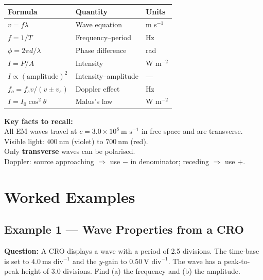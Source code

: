 \begin{minipage}{\linewidth}
\begin{tcolorbox}[colback=lightgold, colframe=accentgold]
\renewcommand{\arraystretch}{1.8}
\begin{tabular}{@{}lll@{}}
\toprule
\textbf{Formula} & \textbf{Quantity} & \textbf{Units} \\
\midrule
$v = f\lambda$ & Wave equation & m s$^{-1}$ \\
$f = 1/T$ & Frequency--period & Hz \\
$\phi = 2\pi d/\lambda$ & Phase difference & rad \\
$I = P/A$ & Intensity & W m$^{-2}$ \\
$I \propto (\text{amplitude})^2$ & Intensity--amplitude & --- \\
$f_o = f_s v/(v \pm v_s)$ & Doppler effect & Hz \\
$I = I_0 \cos^2\theta$ & Malus's law & W m$^{-2}$ \\
\bottomrule
\end{tabular}
\end{tcolorbox}

\vspace{0.5em}
\begin{tcolorbox}[colback=lightblue, colframe=darkblue]
\textbf{Key facts to recall:}\\[0.3em]
All EM waves travel at $c = 3.0\times10^8\ \text{m s}^{-1}$ in free space and are transverse.\\[0.2em]
Visible light: $400\ \text{nm}$ (violet) to $700\ \text{nm}$ (red).\\[0.2em]
Only \textbf{transverse} waves can be polarised.\\[0.2em]
Doppler: source approaching $\Rightarrow$ use $-$ in denominator; receding $\Rightarrow$ use $+$.
\end{tcolorbox}
\end{minipage}


\pagebreak


\section{Worked Examples}

\subsection*{Example 1 --- Wave Properties from a CRO}

\textbf{Question:} A CRO displays a wave with a period of 2.5 divisions. The time-base is set to $4.0\ \text{ms div}^{-1}$ and the $y$-gain to $0.50\ \text{V div}^{-1}$. The wave has a peak-to-peak height of 3.0 divisions. Find (a) the frequency and (b) the amplitude.

